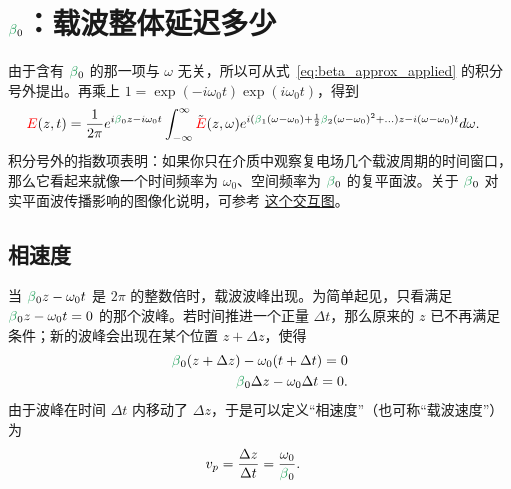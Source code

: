 \section[beta0：载波整体延迟多少]{$\betag_0$：载波整体延迟多少}
由于含有 $\betag_0$ 的那一项与 $\omega$ 无关，所以可从式~\ref{eq:beta_approx_applied} 的积分号外提出。再乘上 $1=\exp(-i\omega_0t)\exp(i\omega_0t)$，得到
\begin{align}
\label{eq:beta_approx_applied2}
    \E(z,t) &= \frac{1}{2\pi} e^{i\betag_0z-i\omega_0t}  \int_{-\infty}^{\infty} \Tilde{\E}(z,\omega) e^{i(\betag_1(\omega-\omega_0)+\frac{1}{2}\betag_2(\omega-\omega_0)^2+...)z-i(\omega-\omega_0) t} d\omega.
\end{align}
积分号外的指数项表明：如果你只在介质中观察复电场几个载波周期的时间窗口，那么它看起来就像一个时间频率为 $\omega_0$、空间频率为 $\betag_0$ 的复平面波。关于 $\betag_0$ 对实平面波传播影响的图像化说明，可参考 \href{https://www.desmos.com/calculator/ausd1wnl2j}{这个交互图}。

\subsection{相速度}
\label{sec:Phase_velocity}
当 $\betag_0z-\omega_0t$ 是 $2\pi$ 的整数倍时，载波波峰出现。为简单起见，只看满足 $\betag_0z-\omega_0t=0$ 的那个波峰。若时间推进一个正量 $\Delta t$，那么原来的 $z$ 已不再满足条件；新的波峰会出现在某个位置 $z+\Delta z$，使得
\begin{align}
    \betag_0(z+\Delta z)-\omega_0(t+\Delta t)=0\\ \nonumber
    \betag_0\Delta z-\omega_0\Delta t=0.
\end{align}
由于波峰在时间 $\Delta t$ 内移动了 $\Delta z$，于是可以定义“相速度”（也可称“载波速度”）为
\begin{align}
\label{eq:Phase_velocity}
    v_p &= \frac{\Delta z}{\Delta t} = \frac{\omega_0}{\betag_0}.
\end{align}


